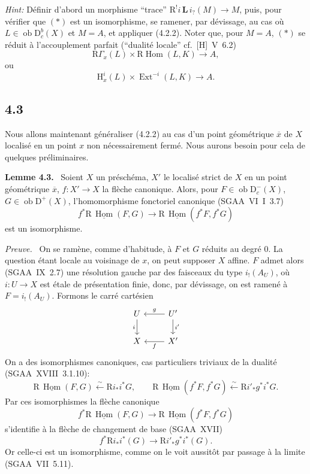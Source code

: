 \documentclass[11pt]{article}
\newenvironment{statement}[1]{\par\medskip\noindent\textbf{#1.}\ }{\par\medskip}
\newenvironment{prooftext}[1][Proof]{\par\noindent\emph{#1.}\ }{\par\medskip}
\renewcommand{\H}{\mathrm{H}}
\DeclareMathOperator{\Hom}{Hom}
\DeclareMathOperator{\Ext}{Ext}
\newcommand{\R}{\mathrm{R}}\newcommand{\RHomCore}{\mathrm{RHom}}
\newcommand{\D}{\mathrm{D}}
\newcommand{\ob}{\operatorname{ob}}
\newcommand{\ol}[1]{\overline{#1}}
\providecommand{\Hom}{\operatorname{Hom}}
\providecommand{\ob}{\operatorname{ob}}
\providecommand{\R}{\mathrm R}
\providecommand{\Hom}{\operatorname{Hom}}
\begin{document}
\emph{Hint:} Définir d'abord un morphisme ``trace'' $\R^{!}i\,\mathbf L\, i_?(M)\to M$, puis, pour vérifier que $(*)$ est un isomorphisme, se ramener, par dévissage, au cas où $L\in\ob\D_c^b(X)$ et $M=A$, et appliquer (4.2.2). Noter que, pour $M=A$, $(*)$ se réduit à l'accouplement parfait (``dualité locale'' cf.~[H]~V~6.2)
\[
\R\Gamma_x(L)\times \R\Hom(L,K)\longrightarrow A,
\]
ou
\[
\H_x^i(L)\times \Ext^{-i}(L,K)\longrightarrow A.
\]

\subsection*{4.3}
Nous allons maintenant généraliser (4.2.2) au cas d'un point géométrique $\ol{x}$ de $X$ localisé en un point $x$ non nécessairement fermé. Nous aurons besoin pour cela de quelques préliminaires.

\begin{statement}{Lemme 4.3}
Soient $X$ un préschéma, $X'$ le localisé strict de $X$ en un point géométrique $\ol{x}$, $f:X'\to X$ la flèche canonique. Alors, pour $F\in\ob\D_c^-(X)$, $G\in\ob\D^+(X)$, l'homomorphisme fonctoriel canonique (SGAA~VI~I~3.7)
\[
f^*\R\,\underline{\Hom}(F,G)\longrightarrow \R\,\underline{\Hom}(f^*F,f^*G)
\]
est un isomorphisme.
\end{statement}

\begin{prooftext}[Preuve]
On se ramène, comme d'habitude, à $F$ et $G$ réduits au degré $0$. La question étant locale au voisinage de $x$, on peut supposer $X$ affine. $F$ admet alors (SGAA~IX~2.7) une résolution gauche par des faisceaux du type $i_!(A_U)$, où $i:U\to X$ est étale de présentation finie, donc, par dévissage, on est ramené à $F=i_!(A_U)$. Formons le carré cartésien
\[
\begin{tikzcd}
U \arrow[d,"i"'] & U' \arrow[l,"g"'] \arrow[d,"i'"] \\
X & X' \arrow[l,"f"]
\end{tikzcd}
\]
On a des isomorphismes canoniques, cas particuliers triviaux de la dualité (SGAA~XVIII~3.1.10):
\[
\R\,\underline{\Hom}(F,G)\xleftarrow{\sim}\R i_* i^*G,
\qquad
\R\,\underline{\Hom}(f^*F,f^*G)\xleftarrow{\sim}\R i'_* g^*i^*G.
\]
Par ces isomorphismes la flèche canonique
\[
f^*\R\,\underline{\Hom}(F,G)\longrightarrow \R\,\underline{\Hom}(f^*F,f^*G)
\]
s'identifie à la flèche de changement de base (SGAA~XVII)
\[
f^*\R i_*i^*(G)\longrightarrow \R i'_*g^*i^*(G).
\]
Or celle-ci est un isomorphisme, comme on le voit aussitôt par passage à la limite (SGAA~VII~5.11).
\end{prooftext}
\end{document}
